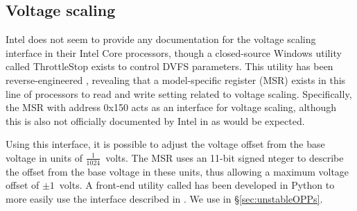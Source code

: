 \subsection{Voltage scaling}
\label{sec:undervolt}

Intel does not seem to provide any documentation for the voltage
scaling interface in their Intel Core processors, though a closed-source
Windows utility called ThrottleStop \cite{throttlestop} exists to control DVFS
parameters. This utility has been reverse-engineered \cite{elersicDoc},
revealing that a model-specific register (MSR) exists in this line of processors
to read and write setting related to voltage scaling. Specifically, the MSR with
address 0x150 acts as an interface for voltage scaling, although this is also
not officially documented by Intel in \cite[Vol. 4, §2.13]{intelDevManual} as
would be expected.

Using this interface, it is possible to adjust the voltage offset from the base
voltage in units of $\frac{1}{1024}$~volts. The MSR uses an 11-bit signed 
nteger to describe the offset from the base voltage in these units, thus
allowing a maximum voltage offset of $\pm{1}$~volts. A front-end utility called
 \cite{whewellUndervolt} has been developed in Python to more
easily use the interface described in \cite{elersicDoc}. We use 
in §\ref{sec:unstableOPPs}.
